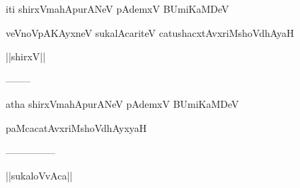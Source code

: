 \documentclass{article}
\begin{document}
\begin{center}
iti shirxVmahApurANeV pAdemxV BUmiKaMDeV
\end{center}

\begin{center}
veVnoVpAKAyxneV sukalAcariteV catushacxtAvxriMshoVdhAyaH
\end{center}

\begin{center}
||shirxV||
\end{center}

\begin{center}
--------
\end{center}

\begin{center}
atha shirxVmahApurANeV pAdemxV BUmiKaMDeV
\end{center}

\begin{center}
paMcacatAvxriMshoVdhAyxyaH
\end{center}

\begin{center}
---------------
\end{center}

\begin{center}
||sukaloVvAca||
\end{center}
\end{document}
